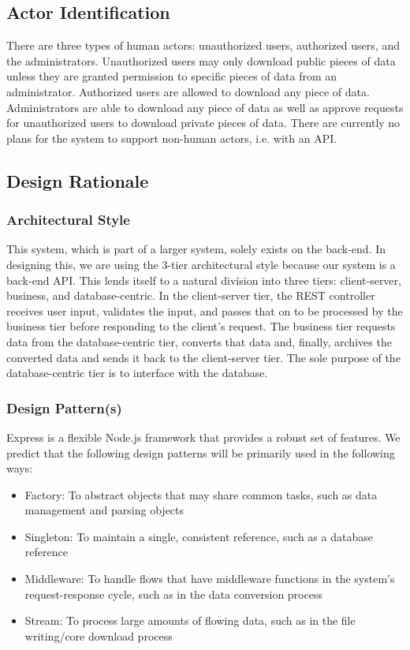 \documentclass{article}
\begin{document}
\clearpage

\subsection{Actor Identification}

There are three types of human actors: unauthorized users, authorized users, and the administrators. Unauthorized users may only download public pieces of data unless they are granted permission to specific pieces of data from an administrator. Authorized users are allowed to download any piece of data. Administrators are able to download any piece of data as well as approve requests for unauthorized users to download private pieces of data. There are currently no plans for the system to support non-human actors, i.e. with an API. 

\subsection{Design Rationale}

\subsubsection{Architectural Style}

This system, which is part of a larger system, solely exists on the back-end. In designing this, we are using the 3-tier architectural style because our system is a back-end API. This lends itself to a natural division into three tiers: client-server, business, and database-centric. In the client-server tier, the REST controller receives user input, validates the input, and passes that on to be processed by the business tier before responding to the client's request. The business tier requests data from the database-centric tier, converts that data and, finally, archives the converted data and sends it back to the client-server tier. The sole purpose of the database-centric tier is to interface with the database. 

\subsubsection{Design Pattern(s)}

Express is a flexible Node.js framework that provides a robust set of features. We predict that the following design patterns will be primarily used in the following ways: \\

\begin{itemize} 
	\item Factory: To abstract objects that may share common tasks, such as data management and parsing objects
	\item Singleton: To maintain a single, consistent reference, such as a database reference
	\item Middleware: To handle flows that have middleware functions in the system's request-response cycle, such as in the data conversion process
	\item Stream: To process large amounts of flowing data, such as in the file writing/core download process
\end{itemize}
\end{document}
